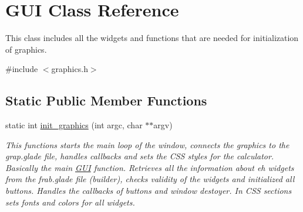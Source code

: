 \hypertarget{class_g_u_i}{}\section{G\+UI Class Reference}
\label{class_g_u_i}


This class includes all the widgets and functions that are needed for initialization of graphics.  




{\ttfamily \#include $<$graphics.\+h$>$}

\subsection*{Static Public Member Functions}
\begin{DoxyCompactItemize}
\item 
static int \mbox{\hyperlink{class_g_u_i_a72e9ac1e445f6c6984b27e063b894dfc}{init\+\_\+graphics}} (int argc, char $\ast$$\ast$argv)
\begin{DoxyCompactList}\small\item\em This functions starts the main loop of the window, connects the graphics to the grap.\+glade file, handles callbacks and sets the C\+SS styles for the calculator. Basically the main \mbox{\hyperlink{class_g_u_i}{G\+UI}} function. Retrieves all the information about eh widgets from the frab.\+glade file (builder), checks validity of the widgets and initialized all buttons. Handles the callbacks of buttons and \textquotesingle{}window destoyer\textquotesingle{}. In C\+SS sections sets fonts and colors for all widgets. \end{DoxyCompactList}\end{DoxyCompactItemize}
